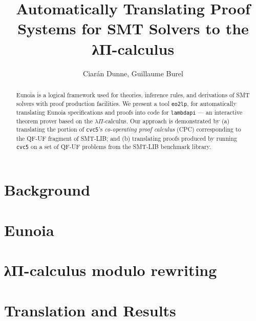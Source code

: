 \documentclass{llncs}
\title{%
	Automatically Translating Proof Systems
	for SMT Solvers to the λΠ-calculus}
\author{Ciarán Dunne, Guillaume Burel}
\institute{INRIA, ENS Paris-Saclay}
\begin{document}
\maketitle

\begin{abstract}
	\noindent
	Eunoia is a logical framework used for
	theories, inference rules, and derivations of SMT solvers with
	proof production facilities.
	We present a tool \texttt{eo2lp}, for automatically translating Eunoia
	specifications and proofs into code for \texttt{lambdapi} ---
	an interactive theorem prover based on the $\lambda\Pi$-calculus.
	Our approach is demonstrated by
	(a) translating the portion of \texttt{cvc5}'s
	\textit{co-operating proof calculus} (CPC) corresponding to the QF-UF
	fragment of SMT-LIB; and
	(b) translating proofs produced by running \texttt{cvc5} on a set of
	QF-UF problems from the SMT-LIB benchmark library.
\end{abstract}

\section{Background}


\section{Eunoia}


\section{λΠ-calculus modulo rewriting}


\section{Translation and Results}


\printbibliography
\end{document}
